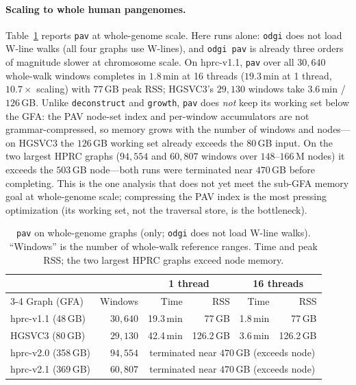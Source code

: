 \paragraph{Scaling to whole human pangenomes.}
Table~\ref{tab:eval-pav-hprc} reports \texttt{pav} at whole-genome scale. Here
\gfaz runs alone: \texttt{odgi} does not load W-line walks (all four graphs use
W-lines), and \texttt{odgi pav} is already three orders of magnitude slower at
chromosome scale. On hprc-v1.1, \texttt{pav} over all $30{,}640$ whole-walk
windows completes in $1.8$\,min at 16 threads ($19.3$\,min at 1 thread,
$10.7\times$ scaling) with $77$\,GB peak RSS; HGSVC3's $29{,}130$ windows take
$3.6$\,min / $126$\,GB. Unlike \texttt{deconstruct} and \texttt{growth},
\texttt{pav} does \emph{not} keep its working set below the GFA: the PAV node-set
index and per-window accumulators are not grammar-compressed, so memory grows
with the number of windows and nodes---on HGSVC3 the $126$\,GB working set
already exceeds the $80$\,GB input. On the two largest HPRC graphs ($94{,}554$
and $60{,}807$ windows over $148$--$166$\,M nodes) it exceeds the $503$\,GB
node---both runs were terminated near $470$\,GB before completing. This is the
one analysis that does not yet meet the sub-GFA memory goal at whole-genome
scale; compressing the PAV index is the most pressing optimization (its working
set, not the traversal store, is the bottleneck).

\begin{table}[t]
\centering
\caption{\texttt{pav} on whole-genome graphs (\gfaz only; \texttt{odgi} does not
load W-line walks). ``Windows'' is the number of whole-walk reference ranges.
Time and peak RSS; the two largest HPRC graphs exceed node memory.}
\label{tab:eval-pav-hprc}
\small
\setlength{\tabcolsep}{4pt}
\begin{tabular}{lrrrrr}
\hline
 & & \multicolumn{2}{c}{1 thread} & \multicolumn{2}{c}{16 threads} \\
\cline{3-4}\cline{5-6}
Graph (GFA) & Windows & Time & RSS & Time & RSS \\
\hline
hprc-v1.1 (48\,GB)  & $30{,}640$ & 19.3\,min & 77\,GB    & 1.8\,min & 77\,GB \\
HGSVC3 (80\,GB)     & $29{,}130$ & 42.4\,min & 126.2\,GB & 3.6\,min & 126.2\,GB \\
\hline
hprc-v2.0 (358\,GB) & $94{,}554$ & \multicolumn{4}{c}{terminated near $470$\,GB (exceeds node)} \\
hprc-v2.1 (369\,GB) & $60{,}807$ & \multicolumn{4}{c}{terminated near $470$\,GB (exceeds node)} \\
\hline
\end{tabular}
\end{table}

